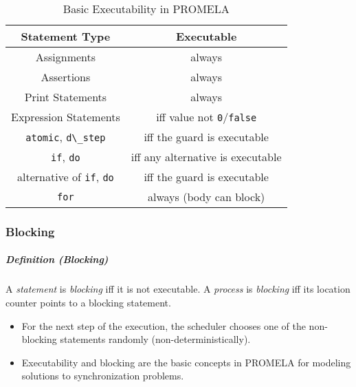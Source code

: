 \documentclass[a4paper, 11pt, accentcolor = tud3b]{tudreport}
\newcommand{\inlinePromela}[1]{\lstinline[language = PROMELA]|#1|}
\newcommand{\definition}[2]{\subparagraph{Definition (#1)} \begin{adjustwidth}{2cm}{} #2 \end{adjustwidth}}
\begin{document}
				\begin{table}
					\centering
					\begin{tabular}{c | c}
						               \textbf{Statement Type}                & \textbf{Executable}                                            \\ \hline
						                     Assignments                      & always                                                         \\
						                     Assertions                       & always                                                         \\
						                  Print Statements                    & always                                                         \\
						                Expression Statements                 & iff value not \inlinePromela{0}/\inlinePromela{false}          \\
						   \inlinePromela{atomic}, \inlinePromela{d\_step}    & iff the guard is executable                                    \\
						       \inlinePromela{if}, \inlinePromela{do}         & iff any alternative is executable                              \\
						alternative of \inlinePromela{if}, \inlinePromela{do} & iff the guard is executable                                    \\
						                 \inlinePromela{for}                  & always (body can block)
					\end{tabular}
					\caption{Basic Executability in PROMELA}
					\label{tab:promelaExec}
				\end{table}

				\subsubsection{Blocking} %
					\definition{Blocking}{A \textit{statement} is \textit{blocking} iff it is not executable. A \textit{process} is \textit{blocking} iff its location counter points to a blocking statement.}
					
					\begin{itemize}
						\item For the next step of the execution, the scheduler chooses one of the non-blocking statements randomly (non-deterministically).
						\item Executability and blocking are the basic concepts in PROMELA for modeling solutions to synchronization problems.
					\end{itemize}
\end{document}
